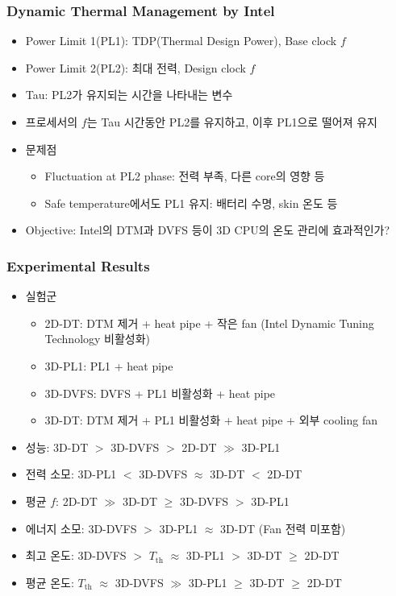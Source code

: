\subsubsection*{Dynamic Thermal Management by Intel}
\begin{itemize}
    \item Power Limit 1(PL1): TDP(Thermal Design Power), Base clock $f$
    \item Power Limit 2(PL2): 최대 전력, Design clock $f$
    \item Tau: PL2가 유지되는 시간을 나타내는 변수
    \item 프로세서의 $f$는 Tau 시간동안 PL2를 유지하고, 이후 PL1으로 떨어져 유지
    \item 문제점
    \begin{itemize}
        \item Fluctuation at PL2 phase: 전력 부족, 다른 core의 영향 등
        \item Safe temperature에서도 PL1 유지: 배터리 수명, skin 온도 등
    \end{itemize}
    \item Objective: Intel의 DTM과 DVFS 등이 3D CPU의 온도 관리에 효과적인가?
\end{itemize}
\begin{figures}
\end{figures}

\subsubsection*{Experimental Results}
\begin{itemize}
    \item 실험군
    \begin{itemize}
        \item 2D-DT: DTM 제거 + heat pipe + 작은 fan (Intel\textsuperscript{\textregistered} Dynamic Tuning Technology 비활성화)
        \item 3D-PL1: PL1 + heat pipe
        \item 3D-DVFS: DVFS + PL1 비활성화 + heat pipe
        \item 3D-DT: DTM 제거 + PL1 비활성화 + heat pipe + 외부 cooling fan
    \end{itemize}
    \item 성능: 3D-DT $>$ 3D-DVFS $>$ 2D-DT $\gg$ 3D-PL1
    \item 전력 소모: 3D-PL1 $<$ 3D-DVFS $\approx$ 3D-DT $<$ 2D-DT
    \item 평균 $f$: 2D-DT $\gg$ 3D-DT $\geq$ 3D-DVFS $>$ 3D-PL1
    \item 에너지 소모: 3D-DVFS $>$ 3D-PL1 $\approx$ 3D-DT (Fan 전력 미포함)
    \item 최고 온도: 3D-DVFS $>$ $T_\mathrm{th}$ $\approx$ 3D-PL1 $>$ 3D-DT $\geq$ 2D-DT
    \item 평균 온도: $T_\mathrm{th}$ $\approx$ 3D-DVFS $\gg$ 3D-PL1 $\geq$ 3D-DT $\geq$ 2D-DT
\end{itemize}

